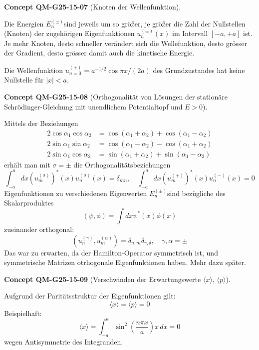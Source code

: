 \documentclass[10pt, letterpaper]{article}
\newcommand{\CustomHeading}[3]{%
  \par\medskip\noindent%
  \textbf{#1 #2} \textnormal{(#3)}.\enskip%
}
\newenvironment{CONC}[2]{\CustomHeading{Concept}{#1}{#2}}{}
\begin{document}
\begin{CONC}{QM-G25-15-07}{Knoten der Wellenfunktion}
Die Energien $E_{n}^{( \pm)}$sind jeweils um so größer, je größer die Zahl der Nullstellen (Knoten) der zugehörigen Eigenfunktionen $u_{n}^{( \pm)}(x)$ im Intervall $[-a,+a]$ ist. Je mehr Knoten, desto schneller verändert sich die Wellefunktion, desto grösser der Gradient, desto grösser damit auch die kinetische Energie.

Die Wellenfunktion $u_{n=0}^{(+)}=a^{-1 / 2} \cos \pi x /(2 a)$ des Grundzustandes hat keine Nullstelle für $|x|<a$.
\end{CONC}

\begin{CONC}{QM-G25-15-08}{Orthogonalität von Lösungen der stationäre Schrödinger-Gleichung mit unendlichem Potentialtopf und $E>0$}
Mittels der Beziehungen
$$
\begin{aligned}
2 \cos \alpha_{1} \cos \alpha_{2} & =\cos \left(\alpha_{1}+\alpha_{2}\right)+\cos \left(\alpha_{1}-\alpha_{2}\right) \\
2 \sin \alpha_{1} \sin \alpha_{2} & =\cos \left(\alpha_{1}-\alpha_{2}\right)-\cos \left(\alpha_{1}+\alpha_{2}\right) \\
2 \sin \alpha_{1} \cos \alpha_{2} & =\sin \left(\alpha_{1}+\alpha_{2}\right)+\sin \left(\alpha_{1}-\alpha_{2}\right)
\end{aligned}
$$
erhält man mit $\sigma= \pm$ die Orthogonalitätsbeziehungen
$$
\int_{-a}^{a} d x\left(u_{m}^{(\sigma)}\right)^{*}(x) u_{n}^{(\sigma)}(x)=\delta_{m n}, \quad \int_{-a}^{a} d x\left(u_{m}^{(+)}\right)^{*}(x) u_{n}^{(-)}(x)=0
$$
Eigenfunktionen zu verschiedenen Eigenwerten $E_{n}^{( \pm)}$sind bezügliche des Skalarproduktes
$$
(\psi, \phi)=\int d x \psi^{*}(x) \phi(x)
$$
zueinander orthogonal:
$$
\left(u_{n}^{(\gamma)}, u_{m}^{(\alpha)}\right)=\delta_{n, m} \delta_{\gamma, \delta}, \quad \gamma, \alpha= \pm
$$
Das war zu erwarten, da der Hamilton-Operator symmetrisch ist, und symmetrische Matrizen otrhogonale Eigenfunktionen haben. Mehr dazu später.
\end{CONC}

\begin{CONC}{QM-G25-15-09}{Verschwinden der Erwartungswerte $\langle x \rangle$, $\langle p \rangle$}
Aufgrund der Paritätsstruktur der Eigenfunktionen gilt:
\[
\langle x \rangle = \langle p \rangle = 0
\]
Beispielhaft:
\[
\langle x \rangle = \int_{-a}^{a} \sin^2\left(\frac{n \pi x}{a}\right) x\, dx = 0
\]
wegen Antisymmetrie des Integranden.
\end{CONC}
\end{document}
